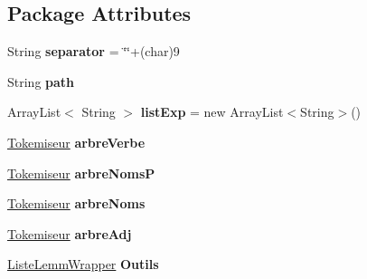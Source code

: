 \subsection*{Package Attributes}
\begin{DoxyCompactItemize}
\item 
String {\bfseries separator} = \char`\"{}\char`\"{}+(char)9\hypertarget{classlemmatiseur_1_1_lefff_a8eaca0b66950fe3bf1e51213bc6bb840}{}\label{classlemmatiseur_1_1_lefff_a8eaca0b66950fe3bf1e51213bc6bb840}

\item 
String {\bfseries path}\hypertarget{classlemmatiseur_1_1_lefff_aed2f27a59a0fac8db1f9a8b13f610a3f}{}\label{classlemmatiseur_1_1_lefff_aed2f27a59a0fac8db1f9a8b13f610a3f}

\item 
Array\+List$<$ String $>$ {\bfseries list\+Exp} = new Array\+List$<$String$>$()\hypertarget{classlemmatiseur_1_1_lefff_a3a9e4df0396631103d3decbf5c6bea96}{}\label{classlemmatiseur_1_1_lefff_a3a9e4df0396631103d3decbf5c6bea96}

\item 
\hyperlink{classtokemisation_1_1_tokemiseur}{Tokemiseur} {\bfseries arbre\+Verbe}\hypertarget{classlemmatiseur_1_1_lefff_ae857e441d839ea39689658e0e92433ee}{}\label{classlemmatiseur_1_1_lefff_ae857e441d839ea39689658e0e92433ee}

\item 
\hyperlink{classtokemisation_1_1_tokemiseur}{Tokemiseur} {\bfseries arbre\+NomsP}\hypertarget{classlemmatiseur_1_1_lefff_a42231187e1fe80e9a5ed4772417ab58e}{}\label{classlemmatiseur_1_1_lefff_a42231187e1fe80e9a5ed4772417ab58e}

\item 
\hyperlink{classtokemisation_1_1_tokemiseur}{Tokemiseur} {\bfseries arbre\+Noms}\hypertarget{classlemmatiseur_1_1_lefff_a70f5c33ccd64e8dac1864f204b432c65}{}\label{classlemmatiseur_1_1_lefff_a70f5c33ccd64e8dac1864f204b432c65}

\item 
\hyperlink{classtokemisation_1_1_tokemiseur}{Tokemiseur} {\bfseries arbre\+Adj}\hypertarget{classlemmatiseur_1_1_lefff_a937ff66d391f58ae4a80fc4912df1f02}{}\label{classlemmatiseur_1_1_lefff_a937ff66d391f58ae4a80fc4912df1f02}

\item 
\hyperlink{classlistelemm_1_1_liste_lemm_wrapper}{Liste\+Lemm\+Wrapper} {\bfseries Outils}\hypertarget{classlemmatiseur_1_1_lefff_abdd2e867e0e5d45d8df6bd4f5ee1fbbd}{}\label{classlemmatiseur_1_1_lefff_abdd2e867e0e5d45d8df6bd4f5ee1fbbd}

\end{DoxyCompactItemize}


